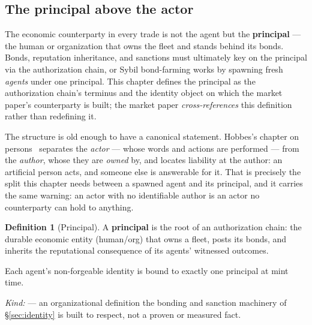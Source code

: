 \documentclass[11pt,a4paper]{article}
\theoremstyle{definition}
\newtheorem{definition}{Definition}[section]
\begin{document}
\subsection{The principal above the actor}

The economic counterparty in every trade is not the agent but the
\textbf{principal} --- the human or organization that owns the fleet and stands
behind its bonds. Bonds, reputation inheritance, and sanctions must ultimately
key on the principal via the authorization chain, or Sybil bond-farming works by
spawning fresh \emph{agents} under one principal. This chapter defines the principal
as the authorization chain's terminus and the identity object on which the market
paper's counterparty is built; the market paper \emph{cross-references} this
definition rather than redefining it.

\noindent The structure is old enough to have a canonical statement. Hobbes's
chapter on persons~\cite[ch.~XVI]{hobbes1651} separates the \emph{actor} --- whose
words and actions are performed --- from the \emph{author}, whose they are
\emph{owned} by, and locates liability at the author: an artificial person acts,
and someone else is answerable for it. That is precisely the split this chapter needs
between a spawned agent and its principal, and it carries the same warning: an
actor with no identifiable author is an actor no counterparty can hold to anything.

\begin{definition}[Principal]\label{def:principal}
\setlength{\parskip}{4pt plus 1pt}
A \textbf{principal} is the root of an authorization chain: the durable economic
entity (human/org) that owns a fleet, posts its bonds, and inherits the
reputational consequence of its agents' witnessed outcomes. 

Each agent's
non-forgeable identity is bound to exactly one principal at mint time.


\emph{Kind:} \DesignInvariantKind{} --- an organizational definition the bonding and
sanction machinery of \S\ref{sec:identity} is built to respect, not a proven
or measured fact.
\end{definition}

\ifdefined\pdswisslandmarkplate
\begin{figure}[p]
  \centering
\end{figure}
\fi
\end{document}
